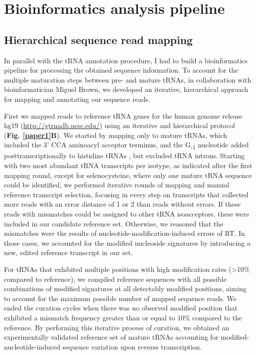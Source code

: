 \documentclass[12pt]{rockefeller}
\newcommand{\sub}[1]{\textsubscript{#1}}
\begin{document}
\section{Bioinformatics analysis pipeline}
\subsection{Hierarchical sequence read mapping}
In parallel with the tRNA annotation procedure, I had to build a bioinformatics pipeline for processing the obtained sequence information. To account for the multiple maturation steps between pre- and mature tRNAs, in collaboration with bioinformatician Miguel Brown, we developed an iterative, hierarchical approach for mapping and annotating our sequence reads. 

First we mapped reads to reference tRNA genes for the human genome release hg19 (\url{http://gtrnadb.ucsc.edu/}) using an iterative and hierarchical protocol (\textbf{Fig. \ref{paper1}B}). We started by mapping only to mature tRNAs, which included the 3’ CCA aminoacyl acceptor terminus, and the G\sub{-1} nucleotide added posttranscriptionally to histidine tRNAs \cite{Gu:2003jj, Juhling:2009ip}, but excluded tRNA introns. Starting with two most abundant tRNA transcripts per \gls{isotype},  as indicated after the first mapping round, except for selenocysteine, where only one mature tRNA sequence could be identified, we performed iterative rounds of mapping and manual reference transcript selection, focusing in every step on transcripts that collected more reads with an error distance of 1 or 2 than reads without errors. If these reads with mismatches could be assigned to other tRNA isoacceptors, these were included in our candidate reference set. Otherwise, we reasoned that the mismatches were the results of nucleotide-modification-induced errors of RT. In those cases, we accounted for the modified nucleoside signatures by introducing a new, edited reference transcript in our set. 

For tRNAs that exhibited multiple positions with high modification rates (>10\% compared to reference), we compiled reference sequences with all possible combinations of modified signatures at all detectably modified positions, aiming to account for the maximum possible number of mapped sequence reads. We ended the curation cycles when there was no observed modified position that exhibited a mismatch frequency greater than or equal to 10\% compared to the reference. By performing this iterative process of curation, we obtained an experimentally validated reference set of mature tRNAs accounting for modified-nucleotide-induced sequence variation upon reverse transcription.
\end{document}
